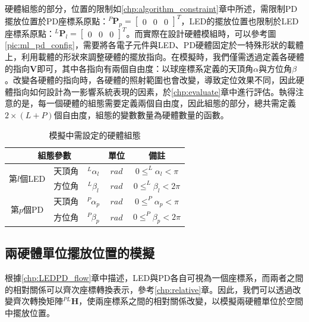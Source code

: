 硬體組態的部分，位置的限制如\ref{chp:algorithm_constraint}章中所述，需限制PD擺放位置於PD座標系原點：$^P\boldsymbol{P}_p=
\left[\begin{array}{ccc}0&0&0\end{array}\right]^T$，LED的擺放位置也限制於LED座標系原點：$^L\boldsymbol{P}_l=
\left[\begin{array}{ccc}0&0&0\end{array}\right]^T$。而實際在設計硬體模組時，可以參考圖\ref{pic:ml_pd_config}，需要將各電子元件與LED、PD硬體固定於一特殊形狀的載體上，利用載體的形狀來調整硬體的擺放指向。在模擬時，我們僅需透過定義各硬體的指向$\boldsymbol{V}$即可，其中各指向有兩個自由度：以球座標系定義的天頂角$\alpha$與方位角$\beta$。改變各硬體的指向時，各硬體的照射範圍也會改變，導致定位效果不同，因此硬體指向如何設計為一影響系統表現的因素，於\ref{chp:evaluate}章中進行評估。執得注意的是，每一個硬體的組態需要定義兩個自由度，因此組態的部分，總共需定義$2\times(L+P)$個自由度，組態的變數數量為硬體數量的函數。

\begin{table}[h]
    \renewcommand{\arraystretch}{1.3}
    \setlength{\arrayrulewidth}{0.15mm}
    \setlength{\doublerulesep}{0.12mm}
    \caption{模擬中需設定的硬體組態}
    \label{tab:para_config}
    \centering
    \begin{tabular}{|c|cc|c|c|}
    \hline
    \multicolumn{3}{|c|}{\textbf{組態參數}}  &\textbf{單位}  &  \textbf{備註}   \\
    \hline
    \multirow{2}{*}{第$l$個LED} 
    & 天頂角 &$^L \alpha_l$ & $rad$ & $0\leq ^L \alpha_l<\pi$ \\
     & 方位角& $^L \beta_l$& $rad$ & $0\leq ^L \beta_l<2\pi$ \\\hline
    \multirow{2}{*}{第$p$個PD} 
    & 天頂角 &$^P \alpha_p$ & $rad$ & $0\leq ^P \alpha_p<\pi$ \\
    & 方位角& $^P \beta_p$& $rad$ & $0\leq ^P \beta_p<2\pi$ \\\hline
    \end{tabular}
    \end{table}
    

\subsection{兩硬體單位擺放位置的模擬}
\label{chp:simulate_position}



根據\ref{chp:LEDPD_flow}章中描述，LED與PD各自可視為一個座標系，而兩者之間的相對關係可以齊次座標轉換表示，參考\ref{chp:relative}章。因此，我們可以透過改變齊次轉換矩陣$^{PL}\boldsymbol{H}$，使兩座標系之間的相對關係改變，以模擬兩硬體單位於空間中擺放位置。

